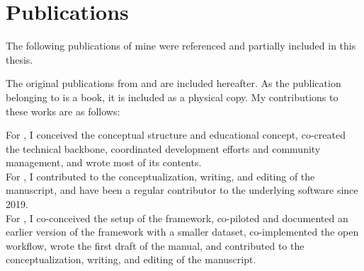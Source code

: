 
\chapter{Publications}

The following publications of mine were referenced and partially included in this thesis.



\begin{refsection}
\nocite{Halchenko2021, wagner2020datalad, wagner2022fairly}
\begin{refcontext}[sorting=nyt]  
	\printbibliography[heading=none, resetnumbers=true]
\end{refcontext}

The original publications from \citep{Halchenko2021} and \citep{wagner2022fairly} are included hereafter.
As the publication belonging to \citep{wagner2020datalad} is a book, it is included as a physical copy.
My contributions to these works are as follows:

For \citet{wagner2020datalad}, I conceived the conceptual structure and educational concept, co-created the technical backbone, coordinated development efforts and community management, and wrote most of its contents.\\
For \citet{Halchenko2021}, I contributed to the conceptualization, writing, and editing of the manuscript, and have been a regular contributor to the underlying software since 2019.\\
For \citet{wagner2022fairly}, I co-conceived the setup of the framework, co-piloted and documented an earlier version of the framework with a smaller dataset, co-implemented the open workflow, wrote the first draft of the manual, and contributed to the conceptualization, writing, and editing of the manuscript.



\end{refsection}
